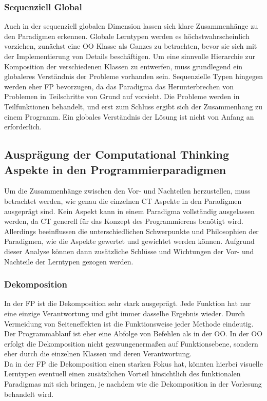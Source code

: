 \subsubsection{Sequenziell Global}
Auch in der sequenziell globalen Dimension lassen sich klare Zusammenhänge zu den Paradigmen erkennen. Globale Lerntypen werden es höchstwahrscheinlich vorziehen, zunächst eine OO Klasse als Ganzes zu betrachten, bevor sie sich mit der Implementierung von Details beschäftigen. Um eine sinnvolle Hierarchie zur Komposition der verschiedenen Klassen zu entwerfen, muss grundlegend ein globaleres Verständnis der Probleme vorhanden sein.
Sequenzielle Typen hingegen werden eher FP bevorzugen, da das Paradigma das Herunterbrechen von Problemen in Teilschritte von Grund auf vorsieht. Die Probleme werden in Teilfunktionen behandelt, und erst zum Schluss ergibt sich der Zusammenhang zu einem Programm. Ein globales Verständnis der Lösung ist nicht von Anfang an erforderlich.

\subsection{Ausprägung der Computational Thinking Aspekte in den Programmierparadigmen}
Um die Zusammenhänge zwischen den Vor- und Nachteilen herzustellen, muss betrachtet werden, wie genau die einzelnen CT Aspekte in den Paradigmen ausgeprägt sind. Kein Aspekt kann in einem Paradigma vollständig ausgelassen werden, da CT generell für das Konzept des Programmierens benötigt wird. Allerdings beeinflussen die unterschiedlichen Schwerpunkte und Philosophien der Paradigmen, wie die Aspekte gewertet und gewichtet werden können.
Aufgrund dieser Analyse können dann zusätzliche Schlüsse und Wichtungen der Vor- und Nachteile der Lerntypen gezogen werden.

\subsubsection{Dekomposition}
In der FP ist die Dekomposition sehr stark ausgeprägt. Jede Funktion hat nur eine einzige Verantwortung und gibt immer dasselbe Ergebnis wieder. Durch Vermeidung von Seiteneffekten ist die Funktionsweise jeder Methode eindeutig. Der Programmablauf ist eher eine Abfolge von Befehlen als in der OO. In der OO erfolgt die Dekomposition nicht gezwungenermaßen auf Funktionsebene, sondern eher durch die einzelnen Klassen und deren Verantwortung.
\\
Da in der FP die Dekomposition einen starken Fokus hat, könnten hierbei visuelle Lerntypen eventuell einen zusätzlichen Vorteil hinsichtlich des funktionalen Paradigmas mit sich bringen, je nachdem wie die Dekomposition in der Vorlesung behandelt wird.

